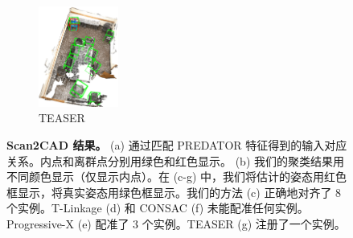 \begin{figure}[ht]
\begin{subfigure}{0.17\textwidth}
          \label{fig:scan2cad_cad-consac}
      \end{subfigure}
      \begin{subfigure}{0.18\textwidth}
        \centering
        \includegraphics[height=3.3cm]{images/scan2cad-cad-teaser.png}
          \caption{TEASER\cite{TEASER}}
          \label{fig:scan2cad_cad-teaser}
      \end{subfigure}
      \caption{\textbf{Scan2CAD 结果。} (a) 通过匹配 PREDATOR \cite{PREDATOR} 特征得到的输入对应关系。内点和离群点分别用绿色和红色显示。 (b) 我们的聚类结果用不同颜色显示（仅显示内点）。在 (c-g) 中，我们将估计的姿态用红色框显示，将真实姿态用绿色框显示。我们的方法 (c) 正确地对齐了 8 个实例。T-Linkage (d) 和 CONSAC (f) 未能配准任何实例。Progressive-X (e) 配准了 3 个实例。TEASER (g) 注册了一个实例。}
\label{fig:Scan2CAD-cadresult}
\end{figure}

